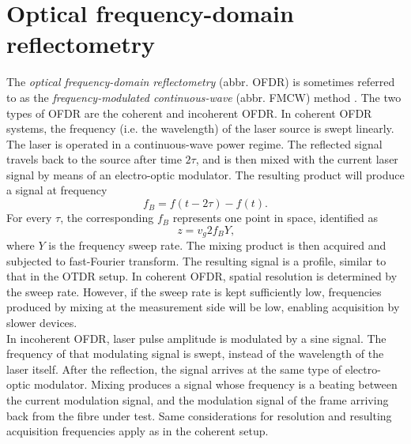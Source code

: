 \documentclass{standalone}
\begin{document}
\section{Optical frequency-domain reflectometry}

The \textit{optical frequency-domain reflectometry} (abbr. OFDR) is sometimes referred to as the \textit{frequency-modulated continuous-wave} (abbr. FMCW) method \cite{Hartog2017} \cite{Farahani1999}. The two types of OFDR are the coherent and incoherent OFDR. In coherent OFDR systems, the frequency (i.e. the wavelength) of the laser source is swept linearly. The laser is operated in a continuous-wave power regime. The reflected signal travels back to the source after time $2 \tau$, and is then mixed with the current laser signal by means of an electro-optic modulator. The resulting product will produce a signal at frequency
\begin{equation}
f_B = f(t - 2 \tau) - f(t) \textrm{.}
\end{equation}
For every $\tau$, the corresponding $f_B$ represents one point in space, identified as
\begin{equation}
z = v_g 2 f_B Y \textrm{,}
\end{equation}
where $Y$ is the frequency sweep rate. The mixing product is then acquired and subjected to fast-Fourier transform. The resulting signal is a profile, similar to that in the OTDR setup. In coherent OFDR, spatial resolution is determined by the sweep rate. However, if the sweep rate is kept sufficiently low, frequencies produced by mixing at the measurement side will be low, enabling acquisition by slower devices. \\

In incoherent OFDR, laser pulse amplitude is modulated by a sine signal. The frequency of that modulating signal is swept, instead of the wavelength of the laser itself. After the reflection, the signal arrives at the same type of electro-optic modulator. Mixing produces a signal whose frequency is a beating between the current modulation signal, and the modulation signal of the frame arriving back from the fibre under test. Same considerations for resolution and resulting acquisition frequencies apply as in the coherent setup. \\
\end{document}
